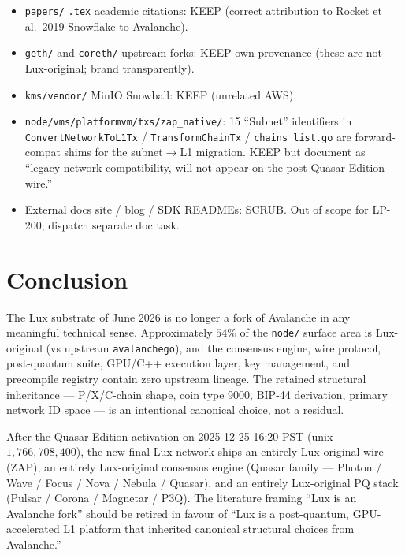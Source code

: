 \documentclass[11pt,a4paper]{article}
\begin{document}
\begin{itemize}[leftmargin=1.4em,topsep=0.2em,itemsep=0.1em]
  \item \texttt{papers/} \texttt{.tex} academic citations: KEEP (correct
        attribution to Rocket et al.~2019 Snowflake-to-Avalanche).
  \item \texttt{geth/} and \texttt{coreth/} upstream forks: KEEP own
        provenance (these are not Lux-original; brand transparently).
  \item \texttt{kms/vendor/} MinIO Snowball: KEEP (unrelated AWS).
  \item \texttt{node/vms/platformvm/txs/zap\_native/}: 15 ``Subnet''
        identifiers in \texttt{ConvertNetworkToL1Tx} / \texttt{TransformChainTx}
        / \texttt{chains\_list.go} are forward-compat shims for the
        subnet$\to$L1 migration. KEEP but document as ``legacy network
        compatibility, will not appear on the post-Quasar-Edition
        wire.''
  \item External docs site / blog / SDK READMEs: SCRUB. Out of scope
        for LP-200; dispatch separate doc task.
\end{itemize}

\section{Conclusion}
\label{sec:conclusion}

The Lux substrate of June 2026 is no longer a fork of Avalanche in any
meaningful technical sense. Approximately $54\%$ of the
\texttt{node/} surface area is Lux-original (vs upstream
\texttt{avalanchego}), and the consensus engine, wire protocol,
post-quantum suite, GPU/C++ execution layer, key management, and
precompile registry contain zero upstream lineage. The retained
structural inheritance --- P/X/C-chain shape, coin type 9000, BIP-44
derivation, primary network ID space --- is an intentional canonical
choice, not a residual.

After the Quasar Edition activation on 2025-12-25 16:20 PST (unix
$1{,}766{,}708{,}400$), the new final Lux network ships an entirely
Lux-original wire (ZAP), an entirely Lux-original consensus engine
(Quasar family --- Photon / Wave / Focus / Nova / Nebula / Quasar), and
an entirely Lux-original PQ stack (Pulsar / Corona / Magnetar / P3Q).
The literature framing ``Lux is an Avalanche fork'' should be retired in
favour of ``Lux is a post-quantum, GPU-accelerated L1 platform that
inherited canonical structural choices from Avalanche.''
\end{document}
